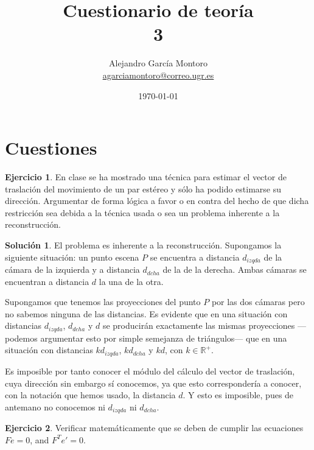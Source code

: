 \documentclass[a4paper, 11pt]{article}
\title{Cuestionario de teoría \\ 3}
\author{Alejandro García Montoro\\
    \href{mailto:agarciamontoro@correo.ugr.es}{agarciamontoro@correo.ugr.es}}
\date{\today}
\theoremstyle{definition}
\newtheorem{ejercicio}{Ejercicio}
\newtheorem*{solucion}{Solución}
\theoremstyle{theorem}
\begin{document}
    \maketitle

    \section{Cuestiones}

    \begin{ejercicio}
        En clase se ha mostrado una técnica para estimar el vector de traslación del movimiento de un par estéreo y sólo ha podido estimarse su dirección. Argumentar de forma lógica a favor o en contra del hecho de que dicha restricción sea debida a la técnica usada o sea un problema inherente a la reconstrucción.
    \end{ejercicio}

    \begin{solucion}
        El problema es inherente a la reconstrucción. Supongamos la siguiente situación: un punto escena $P$ se encuentra a distancia $d_{izqda}$ de la cámara de la izquierda y a distancia $d_{dcha}$ de la de la derecha. Ambas cámaras se encuentran a distancia $d$ la una de la otra.

        Supongamos que tenemos las proyecciones del punto $P$ por las dos cámaras pero no sabemos ninguna de las distancias. Es evidente que en una situación con distancias $d_{izqda}$, $d_{dcha}$ y $d$ se producirán exactamente las mismas proyecciones ---podemos argumentar esto por simple semejanza de triángulos--- que en una situación con distancias $kd_{izqda}$, $kd_{dcha}$ y $kd$, con $k\in\mathbb{R}^+$.

        Es imposible por tanto conocer el módulo del cálculo del vector de traslación, cuya dirección sin embargo sí conocemos, ya que esto correspondería a conocer, con la notación que hemos usado, la distancia $d$. Y esto es imposible, pues de antemano no conocemos ni $d_{izqda}$ ni $d_{dcha}$.
    \end{solucion}

    \begin{ejercicio}
        Verificar matemáticamente que se deben de cumplir las ecuaciones $Fe = 0$, and $F^T e' = 0$.
    \end{ejercicio}
\end{document}
